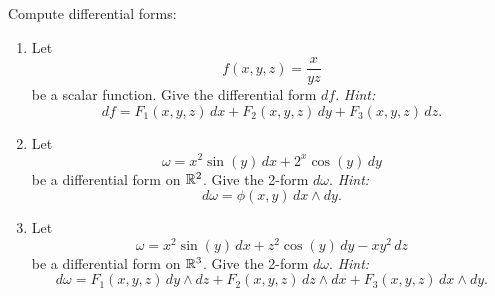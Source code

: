 \begin{exercise}
	Compute differential forms:
	\begin{enumerate}
		\item Let
		      $$
			      f(x,y,z) = \frac{x}{yz}
		      $$
		      be a scalar function. Give the differential form $df$.
		      \newline \emph{Hint:}
		      $$
			      df = F_1(x,y,z) \, dx + F_2(x,y,z) \, dy + F_3(x,y,z) \, dz.
		      $$
		\item Let
		      $$
			      \omega = x^2 \sin(y) \, dx + 2^x \cos(y) \, dy
		      $$
		      be a differential form on $\mathbb{R}^2$. Give the 2-form $d\omega$.
		      \newline \emph{Hint:}
		      $$
			      d\omega = \phi(x,y) \, dx \wedge dy.
		      $$
		\item Let
		      $$
			      \omega = x^2 \sin(y) \, dx + z^2 \cos(y) \, dy - xy^2 \, dz
		      $$
		      be a differential form on $\mathbb{R}^3$. Give the 2-form $d\omega$.
		      \newline \emph{Hint:}
		      $$
			      d\omega = F_1(x,y,z) \, dy \wedge dz + F_2(x,y,z) \, dz \wedge dx + F_3(x,y,z) \, dx \wedge dy.
		      $$
	\end{enumerate}
\end{exercise}

